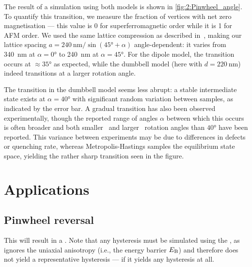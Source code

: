 The result of a \hotspice simulation using both models is shown in \cref{fig:2:Pinwheel_angle}.
To quantify this transition, we measure the fraction of vertices with net zero magnetisation --- this value is 0 for superferromagnetic order while it is 1 for AFM order.
We used the same lattice compression as described in~, making our lattice spacing $a=\SI{240}{\nano\metre} / \sin(\ang{45}+\alpha)$ angle-dependent: it varies from \SI{340}{\nano\metre} at $\alpha=\ang{0}$ to \SI{240}{\nano\metre} at $\alpha=\ang{45}$. 
For the dipole model, the transition occurs at $\approx \ang{35}$ as expected, while the dumbbell model (here with $d = \SI{220}{\nano\metre}$) indeed transitions at a larger rotation angle. \par
The transition in the dumbbell model seems less abrupt: a stable intermediate state exists at $\alpha=\ang{40}$ with significant random variation between samples, as indicated by the error bar. %
A gradual transition has also been observed experimentally, though the reported range of angles $\alpha$ between which this occurs is often broader and both smaller~\cite{ProbingAFM-PMtransition} and larger~\cite{AFM-FM-transition-Pinwheel} rotation angles than $\ang{40}$ have been reported.
This variance between experiments may be due to differences in defects or quenching rate, whereas Metropolis-Hastings samples the equilibrium state space, yielding the rather sharp transition seen in the figure.

\newpage
\section{Applications}
\subsection{Pinwheel reversal}\label{sec:2:Applications_reversal_Pinwheel}
This will result in a .
Note that any hysteresis must be simulated using the , as  ignores the uniaxial anisotropy (i.e., the energy barrier $E_\mathrm{B}$) and therefore does not yield a representative hysteresis --- if it yields any hysteresis at all.

